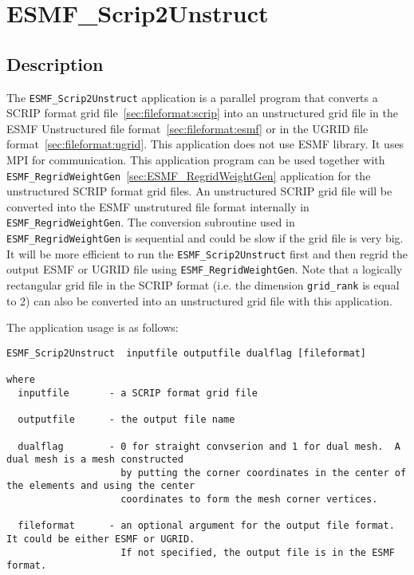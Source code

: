 
\section{ESMF\_Scrip2Unstruct}
\label{sec:ESMF_Scrip2Unstruct}

\subsection{Description}

The {\tt ESMF\_Scrip2Unstruct} application is a parallel program that converts a SCRIP format grid file~\ref{sec:fileformat:scrip} into an unstructured grid file in the ESMF Unstructured file format~\ref{sec:fileformat:esmf} or in the UGRID file format~\ref{sec:fileformat:ugrid}. This application does not use ESMF library. It uses MPI for communication.  This application program can be used together with {\tt ESMF\_RegridWeightGen}~\ref{sec:ESMF_RegridWeightGen} application for the unstructured SCRIP format grid files.  An unstructured SCRIP grid file will be converted into the ESMF unstrutured file format internally in {\tt ESMF\_RegridWeightGen}.  The conversion subroutine used in {\tt ESMF\_RegridWeightGen} is sequential and could be slow if the grid file is very big.  It will be more efficient to run the {\tt ESMF\_Scrip2Unstruct} first and then regrid the output ESMF or UGRID file using {\tt ESMF\_RegridWeightGen}.  Note that a logically rectangular grid file in the SCRIP format (i.e. the dimension {\tt grid\_rank} is equal to 2) can also be converted into an unstructured grid file with this application.   

The application usage is as follows:

\begin{verbatim}
ESMF_Scrip2Unstruct  inputfile outputfile dualflag [fileformat]

where
  inputfile       - a SCRIP format grid file

  outputfile      - the output file name
 
  dualflag        - 0 for straight convserion and 1 for dual mesh.  A dual mesh is a mesh constructed 
                    by putting the corner coordinates in the center of the elements and using the center
                    coordinates to form the mesh corner vertices.

  fileformat      - an optional argument for the output file format.  It could be either ESMF or UGRID.
                    If not specified, the output file is in the ESMF format.  
  
\end{verbatim}
